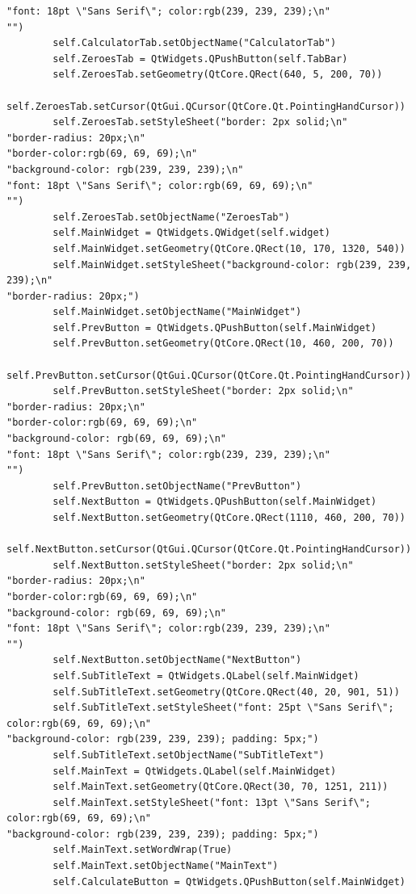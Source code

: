 \documentclass[12pt]{article}
\begin{document}
\begin{lstlisting}
"font: 18pt \"Sans Serif\"; color:rgb(239, 239, 239);\n"
"")
        self.CalculatorTab.setObjectName("CalculatorTab")
        self.ZeroesTab = QtWidgets.QPushButton(self.TabBar)
        self.ZeroesTab.setGeometry(QtCore.QRect(640, 5, 200, 70))
        self.ZeroesTab.setCursor(QtGui.QCursor(QtCore.Qt.PointingHandCursor))
        self.ZeroesTab.setStyleSheet("border: 2px solid;\n"
"border-radius: 20px;\n"
"border-color:rgb(69, 69, 69);\n"
"background-color: rgb(239, 239, 239);\n"
"font: 18pt \"Sans Serif\"; color:rgb(69, 69, 69);\n"
"")
        self.ZeroesTab.setObjectName("ZeroesTab")
        self.MainWidget = QtWidgets.QWidget(self.widget)
        self.MainWidget.setGeometry(QtCore.QRect(10, 170, 1320, 540))
        self.MainWidget.setStyleSheet("background-color: rgb(239, 239, 239);\n"
"border-radius: 20px;")
        self.MainWidget.setObjectName("MainWidget")
        self.PrevButton = QtWidgets.QPushButton(self.MainWidget)
        self.PrevButton.setGeometry(QtCore.QRect(10, 460, 200, 70))
        self.PrevButton.setCursor(QtGui.QCursor(QtCore.Qt.PointingHandCursor))
        self.PrevButton.setStyleSheet("border: 2px solid;\n"
"border-radius: 20px;\n"
"border-color:rgb(69, 69, 69);\n"
"background-color: rgb(69, 69, 69);\n"
"font: 18pt \"Sans Serif\"; color:rgb(239, 239, 239);\n"
"")
        self.PrevButton.setObjectName("PrevButton")
        self.NextButton = QtWidgets.QPushButton(self.MainWidget)
        self.NextButton.setGeometry(QtCore.QRect(1110, 460, 200, 70))
        self.NextButton.setCursor(QtGui.QCursor(QtCore.Qt.PointingHandCursor))
        self.NextButton.setStyleSheet("border: 2px solid;\n"
"border-radius: 20px;\n"
"border-color:rgb(69, 69, 69);\n"
"background-color: rgb(69, 69, 69);\n"
"font: 18pt \"Sans Serif\"; color:rgb(239, 239, 239);\n"
"")
        self.NextButton.setObjectName("NextButton")
        self.SubTitleText = QtWidgets.QLabel(self.MainWidget)
        self.SubTitleText.setGeometry(QtCore.QRect(40, 20, 901, 51))
        self.SubTitleText.setStyleSheet("font: 25pt \"Sans Serif\"; color:rgb(69, 69, 69);\n"
"background-color: rgb(239, 239, 239); padding: 5px;")
        self.SubTitleText.setObjectName("SubTitleText")
        self.MainText = QtWidgets.QLabel(self.MainWidget)
        self.MainText.setGeometry(QtCore.QRect(30, 70, 1251, 211))
        self.MainText.setStyleSheet("font: 13pt \"Sans Serif\"; color:rgb(69, 69, 69);\n"
"background-color: rgb(239, 239, 239); padding: 5px;")
        self.MainText.setWordWrap(True)
        self.MainText.setObjectName("MainText")
        self.CalculateButton = QtWidgets.QPushButton(self.MainWidget)

\end{lstlisting}
\end{document}
